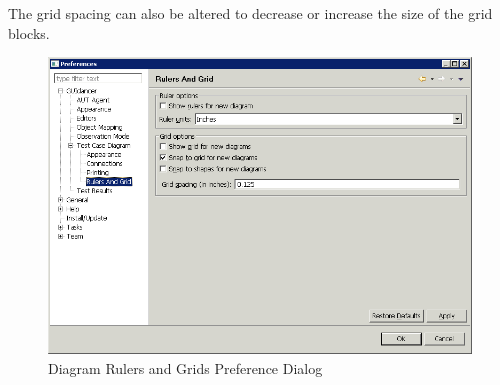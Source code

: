 The grid spacing can also be altered to decrease or increase the size of the grid blocks.  

\begin{figure}[h]
\begin{center}
\includegraphics[width=12.5cm]{Tasks/Preferences/PS/diagramrulersprefs}
\caption{Diagram Rulers and Grids Preference Dialog}
\label{diagramrulersprefs}
\end{center}
\end{figure}
